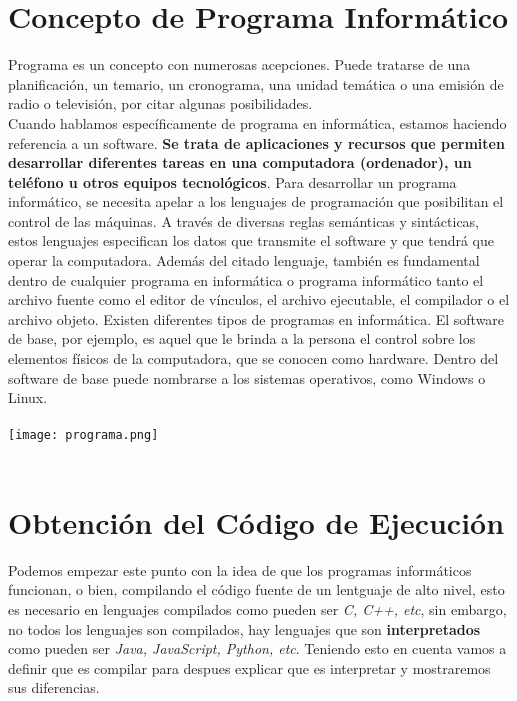 \documentclass{article}
\begin{document}
\newpage
\section{Concepto de Programa Informático}
Programa es un concepto con numerosas acepciones. Puede tratarse de una planificación, un temario, un cronograma, una unidad temática o una emisión de radio o televisión, por citar algunas posibilidades.
\\
Cuando hablamos específicamente de programa en informática, estamos haciendo referencia a un software. \textbf{Se trata de aplicaciones y recursos que permiten desarrollar diferentes tareas en una computadora (ordenador), 
un teléfono u otros equipos tecnológicos}. Para desarrollar un programa informático, se necesita apelar a los lenguajes de programación que posibilitan el control de las máquinas. A través de diversas reglas semánticas 
y sintácticas, estos lenguajes especifican los datos que transmite el software y que tendrá que operar la computadora. Además del citado lenguaje, también es fundamental dentro de cualquier programa en informática o 
programa informático tanto el archivo fuente como el editor de vínculos, el archivo ejecutable, el compilador o el archivo objeto. Existen diferentes tipos de programas en informática. El software de base, por ejemplo, 
es aquel que le brinda a la persona el control sobre los elementos físicos de la computadora, que se conocen como hardware. Dentro del software de base puede nombrarse a los sistemas operativos, como Windows o Linux.
\\
\\
\texttt{[image: programa.png]}
\\
\\

\newpage
\section{Obtención del Código de Ejecución}
Podemos empezar este punto con la idea de que los programas informáticos funcionan, o bien, compilando el código fuente de un lentguaje de alto nivel, esto es necesario en lenguajes compilados como pueden ser \textit{C, C++, etc},
sin embargo, no todos los lenguajes son compilados, hay lenguajes que son \textbf{interpretados} como pueden ser \textit{Java, JavaScript, Python, etc}. Teniendo esto en cuenta vamos a definir que es compilar para despues explicar 
que es interpretar y mostraremos sus diferencias.
\end{document}
